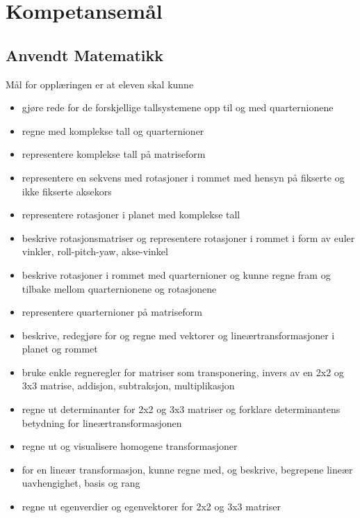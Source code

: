 \section*{Kompetansemål} \label{Sec: Kompetansemaal}

\subsection*{Anvendt Matematikk}

    Mål for opplæringen er at eleven skal kunne

    \begin{itemize}
        \item gjøre rede for de forskjellige tallsystemene opp til og med quarternionene
        \item regne med komplekse tall og quarternioner
        \item representere komplekse tall på matriseform
        \item representere en sekvens med rotasjoner i rommet med hensyn på fikserte og ikke fikserte aksekors
        \item representere rotasjoner i planet med komplekse tall
        \item beskrive rotasjonsmatriser og representere rotasjoner i rommet i form av euler vinkler, roll-pitch-yaw, akse-vinkel
        \item beskrive rotasjoner i rommet med quarternioner og kunne regne fram og tilbake mellom quarternionene og rotasjonene
        \item representere quarternioner på matriseform
        \item beskrive, redegjøre for og regne med vektorer og lineærtransformasjoner i planet og rommet
        \item bruke enkle regneregler for matriser som transponering, invers av en 2x2 og 3x3 matrise, addisjon, subtraksjon, multiplikasjon
        \item regne ut determinanter for 2x2 og 3x3 matriser og forklare determinantens betydning for lineærtransformasjonen
        \item regne ut og visualisere homogene transformasjoner
        \item for en lineær transformasjon, kunne regne med, og beskrive, begrepene lineær uavhengighet, basis og rang
        \item regne ut egenverdier og egenvektorer for 2x2 og 3x3 matriser
    \end{itemize}


